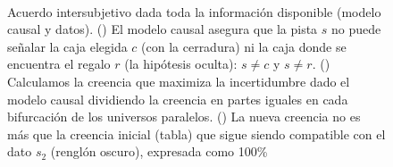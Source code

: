 \documentclass[a4paper,11pt]{book}
\theoremstyle{definition}
\begin{document}
\begin{figure}[ht!]
\begin{subfigure}[b]{0.34\textwidth}
  \phantom{--}\\[0.1cm]


\caption{}
\label{fig:f3}
\end{subfigure}
\caption{
Acuerdo intersubjetivo dada toda la informaci\'on disponible (modelo causal y datos).
%
() El modelo causal asegura que la pista $s$ no puede se\~nalar la caja elegida $c$ (con la cerradura) ni la caja donde se encuentra el regalo $r$ (la hip\'otesis oculta): $s\neq c$ y $s\neq r$.
%
() Calculamos la creencia que maximiza la incertidumbre dado el modelo causal dividiendo la creencia en partes iguales en cada bifurcaci\'on de los universos paralelos.
%
() La nueva creencia no es m\'as que la creencia inicial (tabla) que sigue siendo compatible con el dato $s_2$ (rengl\'on oscuro), expresada como 100\%
}
\label{fig:monty_hall}
\end{figure}

\end{document}
